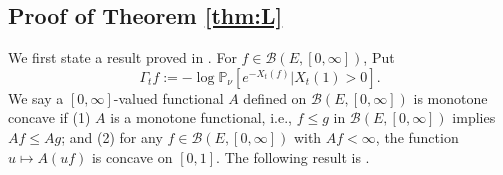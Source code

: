 \documentclass[12pt,a4paper]{amsart}
\numberwithin{equation}{section}
\theoremstyle{plain}
\theoremstyle{definition}
\theoremstyle{remark}
\begin{document}
\begin{comment}
If we can prove for some $\varepsilon>0$, there exist $t_0>0$ and $\delta>0$ such that 
when $t<-t_0$,
\begin{equation}\label{last point}
\inf_{r\geq \phi(x)^{-1}e^{-Nt}, x\in E}\mathbb P_{r\delta_x}\big(\langle\phi, X_{-t}
\rangle >\varepsilon\big)>\delta,
\end{equation}
then from \eqref{inf}, \eqref{infty-sum} is obtained.  By Chebyshev's inequality, for any $\varepsilon>0$,
\begin{align}
&\mathbb P_{r\delta_x}\big(\langle\phi, X_{-t}\rangle >\varepsilon\big)=\mathbb P_{r\delta_x}\left(e^{-\langle\phi, X_{-t}\rangle }<e^{-\varepsilon}\right)\\
=&1-\mathbb P_{r\delta_x}\left(e^{-\langle\phi, X_{-t}
\rangle }\geq e^{-\varepsilon}\right)\geq 1-e^{\varepsilon }\mathbb P_{r\delta_x}e^{-\langle\phi, X_{-t}\rangle }\\
	=&1-e^{\varepsilon }e^{-rV_{-t}\phi(x)},\label{Cheby}
\end{align}
According to Lemma \ref{lem:rate} and \eqref{inequ:lower}, 
when $-t$ is sufficiently large, we have
\[
V_{-t}\phi(x)\ge\frac{1}{2}\phi(x)\nu(V_{-t}\phi)\geq \dfrac{a}{2}\phi(x)e^{Nt},\quad x\in E.
\]
Therefore, using \eqref{Cheby}, we obtain that, when $-t$ is sufficiently large,
\begin{eqnarray*}
  &&\inf_{r\geq \phi(x)^{-1}e^{-Nt}, x\in E}\mathbb P_{r\delta_x}\big(\langle\phi, X_{-t} \rangle >\varepsilon\big)\geq \inf_{r\geq \phi(x)^{-1}e^{-Nt}, x\in E} \left(1-e^{\varepsilon}e^{-rV_{-t}\phi(x)}\right)\\ 
&&     \geq 1-e^{\varepsilon-a/2}.
\end{eqnarray*}
Then we get \eqref{last point} by	choosing $\varepsilon\in(0, a/2)$ and $\delta=1-e^{\varepsilon-a/2}$.  Then
\eqref{Z-infty} follows, and thus $k=0$. The proof is finished.
\end{proof}
\end{comment}

\subsection{Proof of Theorem \ref{thm:L}}
We first state a result proved in \cite{LiuRenSongSun2020}. For $f\in \mathcal B(E, [0,\infty])$, Put
$$
\Gamma_t f:=-\log \mathbb P_{\nu}[e^{-X_t(f)}|X_t(1)>0].
$$
We say a $[0,\infty]$-valued functional $A$ defined on $\mathcal B(E,[0,\infty])$ is monotone concave if
	(1) $A$ is a monotone functional, i.e., $f\leq g$ in $\mathcal B(E,[0,\infty])$ implies $Af \leq Ag$; and
	(2) for any $f\in \mathcal B(E,[0,\infty])$ with $Af< \infty$, the function $u \mapsto A(uf)$ is concave on $[0,1]$.
The following result is \cite[Proposition 1.5, Proposition 1.9]{LiuRenSongSun2020}.
\end{document}
